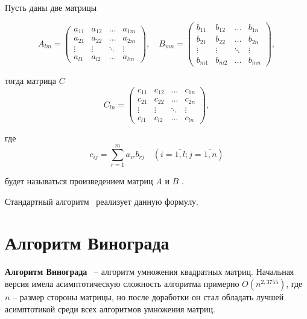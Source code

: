 Пусть даны две матрицы

\begin{equation}
	A_{lm} = \begin{pmatrix}
		a_{11} & a_{12} & \ldots & a_{1m}\\
		a_{21} & a_{22} & \ldots & a_{2m}\\
		\vdots & \vdots & \ddots & \vdots\\
		a_{l1} & a_{l2} & \ldots & a_{lm}
	\end{pmatrix},
	\quad
	B_{mn} = \begin{pmatrix}
		b_{11} & b_{12} & \ldots & b_{1n}\\
		b_{21} & b_{22} & \ldots & b_{2n}\\
		\vdots & \vdots & \ddots & \vdots\\
		b_{m1} & b_{m2} & \ldots & b_{mn}
	\end{pmatrix},
\end{equation}

тогда матрица $C$
\begin{equation}
	C_{ln} = \begin{pmatrix}
		c_{11} & c_{12} & \ldots & c_{1n}\\
		c_{21} & c_{22} & \ldots & c_{2n}\\
		\vdots & \vdots & \ddots & \vdots\\
		c_{l1} & c_{l2} & \ldots & c_{ln}
	\end{pmatrix},
\end{equation}

где
\begin{equation}
	\label{eq:M}
	c_{ij} =
	\sum_{r=1}^{m} a_{ir}b_{rj} \quad (i=\overline{1,l}; j=\overline{1,n})
\end{equation}

будет называться произведением матриц $A$ и $B$ \cite{matrix}.

Стандартный алгоритм~\cite{vinograd-matrix} реализует данную формулу.


\section{Алгоритм Винограда}

\textbf{Алгоритм Винограда}~\cite{vinograd-matrix} -- алгоритм умножения квадратных матриц. Начальная версия имела асимптотическую сложность алгоритма примерно $O(n^{2,3755})$, где $n$ -- размер стороны матрицы, но после доработки он стал обладать лучшей асимптотикой среди всех алгоритмов умножения матриц.

